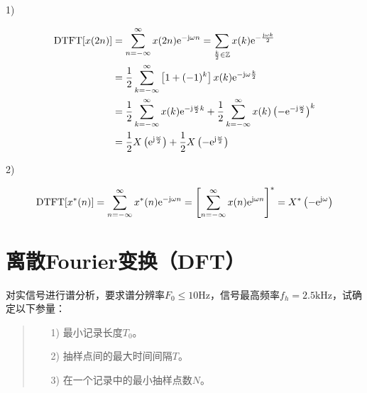 \documentclass[cn, hazy, blue, normal, 12pt]{elegantnote}
\begin{document}
\begin{solution}[print=true]

1) 

\begin{equation}
\notag
\begin{aligned}
    \text{DTFT}[x(2n)]&=\sum_{n=-\infty}^{\infty}x(2n)\text{e}^{-\text{j}\omega n}=\sum_{\frac{k}{2}\in\mathbb{Z}}x(k)\text{e}^{-\frac{\text{j}\omega k}{2}} \\
    &=\frac{1}{2}\sum_{k=-\infty}^{\infty}\left[1+(-1)^k\right]x(k)\text{e}^{-\text{j}\omega\frac{k}{2}} \\
    &=\frac{1}{2}\sum_{k=-\infty}^{\infty}x(k)\text{e}^{-\text{j}\frac{\omega}{2}k}+\frac{1}{2}\sum_{k=-\infty}^{\infty}x(k)\left(-\text{e}^{-\text{j}\frac{\omega}{2}}\right)^k \\
    &=\frac{1}{2}X\left(\text{e}^{\text{j}\frac{\omega}{2}}\right)+\frac{1}{2}X\left(-\text{e}^{\text{j}\frac{\omega}{2}}\right)
\end{aligned}
\end{equation}

2)

\begin{equation}
\notag
    \text{DTFT}[x^*(n)]=\sum_{n=-\infty}^{\infty}x^*(n)\text{e}^{-\text{j}\omega n}=\left[\sum_{n=-\infty}^{\infty}x(n)\text{e}^{\text{j}\omega n}\right]^*=X^*\left(-\text{e}^{\text{j}\omega}\right)
\end{equation}

\end{solution}


\section{离散Fourier变换（DFT）}


\begin{exercise}

对实信号进行谱分析，要求谱分辨率$F_0\leq 10\text{Hz}$，信号最高频率$f_h=2.5\text{kHz}$，试确定以下参量：

\begin{quote}
\begin{itemize}
    \item[1)] 最小记录长度$T_0$。
    \item[2)] 抽样点间的最大时间间隔$T$。
    \item[3)] 在一个记录中的最小抽样点数$N$。
\end{itemize}
\end{quote}

\end{exercise}
\end{document}
